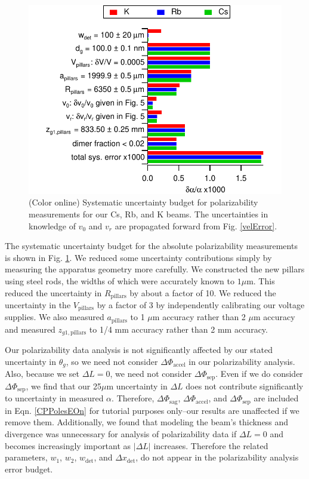 \documentclass[twocolumn,prl,showpacs,superscriptaddress]{revtex4-1}   %
\newcommand{\figref}[1]{Fig. \ref{#1}}
\newcommand{\eqnref}[1]{Eqn. \eqref{#1}}
\newcommand{\dphisep}{\Delta\Phi_{\mathrm{sep}}}
\newcommand{\dphisag}{\Delta\Phi_{\mathrm{sag}}}
\newcommand{\dphiaccel}{\Delta\Phi_{\mathrm{accel}}}
\begin{document}
\begin{figure}
\includegraphics[width=\linewidth,keepaspectratio]{displayPolErrors.pdf}
\caption{\label{polError}(Color online) Systematic uncertainty budget for polarizability measurements for our Cs, Rb, and K beams.
The uncertainties in knowledge of $v_0$ and $v_r$ are propagated forward from \figref{velError}.}
\end{figure}

The systematic uncertainty budget for the absolute polarizability measurements is shown in \figref{polError}. We reduced some uncertainty contributions simply by measuring the apparatus geometry more carefully.
We constructed the new pillars using steel rods, the widths of which were accurately known to $1 \mu \text{m}$. This reduced the uncertainty in $R_{\mathrm{pillars}}$ by about a factor of 10.
We reduced the uncertainty in the $V_{\mathrm{pillars}}$ by a factor of 3 by independently calibrating our voltage supplies. We also measured $a_{\mathrm{pillars}}$ to 1 $\mu$m accuracy rather than 2 $\mu$m accuracy and measured $z_{g1,\mathrm{pillars}}$ to 1/4 mm accuracy rather than 2 mm accuracy. 

Our polarizability data analysis is not significantly affected by our stated uncertainty in $\theta_g$, so we need not consider $\dphiaccel$ in our polarizability analysis.
Also, because we set $\Delta L = 0$, we need not consider $\dphisep$.
Even if we do consider $\dphisep$, we find that our 25$\mu$m uncertainty in $\Delta L$ does not contribute significantly to uncertainty in measured $\alpha$.
Therefore, $\dphisag$, $\dphiaccel$, and $\dphisep$ are included in \eqnref{CPPolesEOn} for tutorial purposes only--our results are unaffected if we remove them.
Additionally, we found that modeling the beam's thickness and divergence was unnecessary for analysis of polarizability data if $\Delta L = 0$ and becomes increasingly important as $|\Delta L|$ increases.
Therefore the related parameters, $w_1$, $w_2$, $w_{\mathrm{det}}$, and $\Delta x_{\mathrm{det}}$, do not appear in the polarizability analysis error budget.
\end{document}
